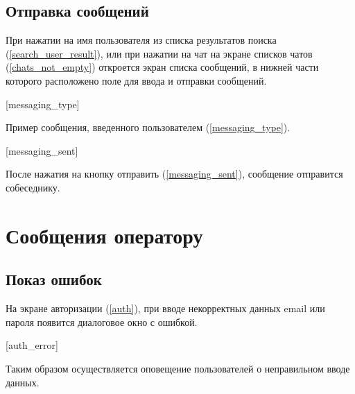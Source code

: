\documentclass[opermanual]{espd}
\begin{document}
\subsection{Отправка сообщений}

При нажатии на имя пользователя из списка результатов поиска (\ref{search_user_result}), или при нажатии на чат на экране списков чатов (\ref{chats_not_empty}) откроется экран списка сообщений, в нижней части которого расположено поле для ввода и отправки сообщений.

[messaging_type]

Пример сообщения, введенного пользователем (\ref{messaging_type}).

[messaging_sent]

После нажатия на кнопку отправить (\ref{messaging_sent}), сообщение отправится собеседнику.

\section{Сообщения оператору}

\subsection{Показ ошибок}

На экране авторизации (\ref{auth}), при вводе некорректных данных email или пароля появится диалоговое окно с ошибкой. 

[auth_error]

Таким образом осуществляется оповещение пользователей о неправильном вводе данных.  
 
\end{document}

